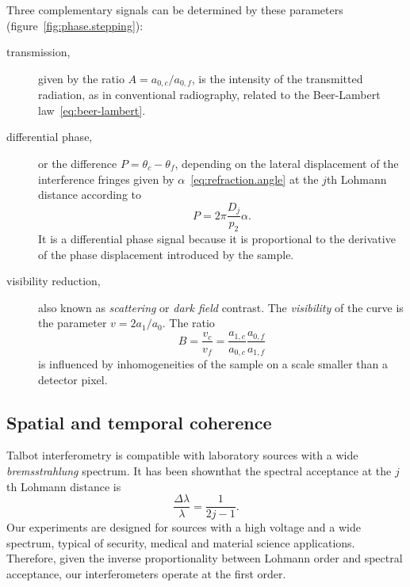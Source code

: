Three complementary signals can be determined by these parameters
(figure~\ref{fig:phase.stepping}):
\begin{description}
    \item[transmission,] given by the ratio $A = a_{0,c} / a_{0,f}$, is the
        intensity of the transmitted radiation, as in conventional
        radiography, related to the Beer-Lambert
        law~\eqref{eq:beer-lambert}.
    \item[differential phase,] or the difference $P = \theta_{c} -
        \theta_f$, depending on the lateral displacement of the interference
        fringes given by
        $\alpha$~\eqref{eq:refraction.angle} at the
        $j$th Lohmann distance according to
        \begin{equation}
            P = 2\pi \frac{D_j}{p_2}\alpha.\label{eq:differential.phase}
        \end{equation}
        It is a differential phase signal because it is proportional to the
        derivative of the phase displacement introduced by the sample.
    \item[visibility reduction,] also known as 
        \emph{scattering} or \emph{dark field} contrast. The
        \emph{visibility} of the curve is the parameter
        $v = 2a_1 / a_0$. The ratio
        \begin{equation*}
            B = \frac{v_c}{v_f} =
            \frac{a_{1,c}}{a_{0,c}}\frac{a_{0,f}}{a_{1,f}}
        \end{equation*}
        is influenced by inhomogeneities of the sample on a scale smaller
        than a detector pixel\cn.
\end{description}

\subsection{Spatial and temporal coherence}\label{sec:coherence}
Talbot interferometry is compatible with laboratory sources with a wide
\emph{bremsstrahlung} spectrum. It has been shown\cn that the spectral
acceptance at the $j$th Lohmann distance is
\begin{equation}
    \frac{\Delta \lambda}{\lambda} = \frac{1}{2j - 1}.\label{eq:acceptance}
\end{equation}
Our experiments are designed for sources with a high voltage and a wide
spectrum, typical of security, medical and material science applications.
Therefore, given the inverse proportionality between Lohmann order
and spectral acceptance, our interferometers operate at the first order.

